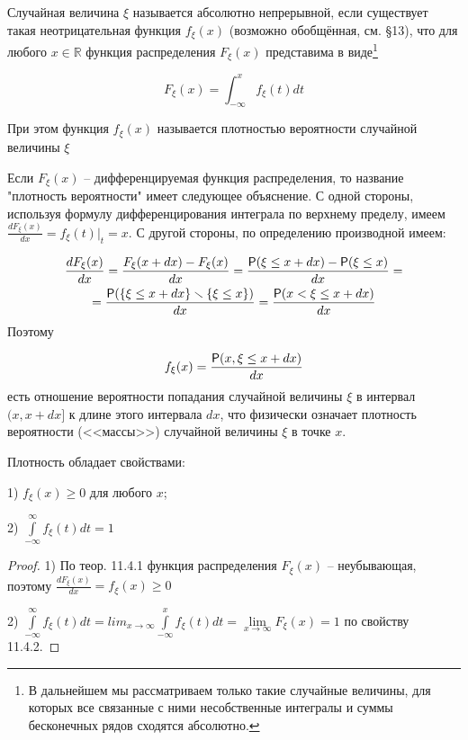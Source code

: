 \begin{definition}
\label{def:12.1}
	Случайная величина $\xi$ называется абсолютно непрерывной, если существует такая неотрицательная функция $f_{\xi} (x)$ (возможно обобщённая, см. §13), что для любого $x \in \mathbb{R}$ функция распределения $F_{\xi}(x)$ представима в виде\footnote{В дальнейшем мы рассматриваем только такие случайные величины, для которых все связанные с
ними несобственные интегралы и суммы бесконечных рядов сходятся абсолютно.
	}
  
\begin{equation*}
	F_{\xi}(x)=\int_{-\infty}^{x} f_{\xi}(t) dt  	
\end{equation*}

При этом функция $f_{\xi}(x)$ называется плотностью вероятности случайной величины $\xi$
\end{definition}

\begin{zam}
\label{zam:12.2}
Если $F_{\xi}(x)$ -- дифференцируемая функция распределения, то название "плотность вероятности" имеет следующее объяснение. С одной стороны, используя формулу дифференцирования интеграла по верхнему пределу, имеем $\frac{dF_{\xi}(x)}{dx}=f_{\xi}(t)|_t=x$. С другой стороны, по определению производной имеем:

\begin{gather*}
	\frac{dF_{\xi}(x)}{dx} = \frac{F_{\xi}(x+dx)-F_{\xi}(x)}{dx}=\frac{\P(\xi \leq x+dx)-\P(\xi \leq x)}{dx}=\\=\frac{\P(\{\xi \leq x+dx \}\ssm \{\xi \leq x\})}{dx} = \frac{\P(x<\xi \leq x+dx)}{dx}
\end{gather*}
Поэтому

\begin{equation*}
	f_{\xi}(x)=\frac{\P(x,\xi \leq x+dx)}{dx}	
\end{equation*}
есть отношение вероятности попадания случайной величины $\xi$ в интервал $(x, x+dx]$ к длине этого интервала $dx$, что физически означает плотность вероятности (<<массы>>) случайной величины $\xi$ в точке $x$.
\end{zam}
 

 \begin{theorem}
 \label{th:12.3}
Плотность обладает свойствами:

1) $f_{\xi}(x) \geq 0$ для любого $x$;

2) $\int\limits_{-\infty}^{\infty} f_{\xi}(t)dt=1$
 \end{theorem}

\begin{proof}

1) По теор. 11.4.1 функция распределения $F_{\xi}(x)$ -- неубывающая, поэтому $\frac{dF_{\xi}(x)}{dx}=f_{\xi}(x) \geq 0$

2) $\int\limits_{-\infty}^{\infty}f_{\xi}(t)dt = lim_{x \to \infty}\int\limits_{-\infty}^{x}f_{\xi}(t)dt = \lim\limits_{x \to \infty}F_{\xi}(x) = 1$ по свойству 11.4.2.
\end{proof} 

